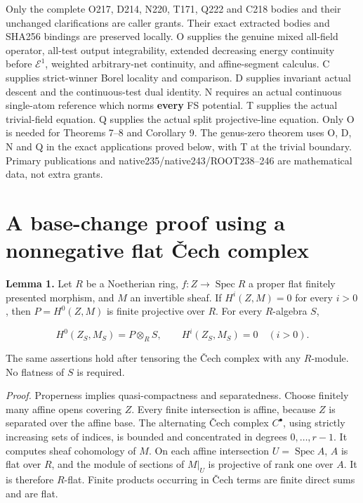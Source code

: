 \documentclass[
  11pt,
]{article}
\begin{document}
Only the complete O217, D214, N220, T171, Q222 and C218 bodies and their
unchanged clarifications are caller grants. Their exact extracted bodies
and SHA256 bindings are preserved locally. O supplies the genuine mixed
all-field operator, all-test output integrability, extended decreasing
energy continuity before \(\mathcal E^1\), weighted arbitrary-net
continuity, and affine-segment calculus. C supplies strict-winner Borel
locality and comparison. D supplies invariant actual descent and the
continuous-test dual identity. N requires an actual continuous
single-atom reference which norms \textbf{every} FS potential. T
supplies the actual trivial-field equation. Q supplies the actual split
projective-line equation. Only O is needed for Theorems 7--8 and
Corollary 9. The genus-zero theorem uses O, D, N and Q in the exact
applications proved below, with T at the trivial boundary. Primary
publications and native235/native243/ROOT238--246 are mathematical data,
not extra grants.

\section{A base-change proof using a nonnegative flat Čech
complex}\label{a-base-change-proof-using-a-nonnegative-flat-ux10dech-complex}

\textbf{Lemma 1.} Let \(R\) be a Noetherian ring,
\(f:Z\to\operatorname{Spec}R\) a proper flat finitely presented
morphism, and \(M\) an invertible sheaf. If \(H^i(Z,M)=0\) for every
\(i>0\), then \(P=H^0(Z,M)\) is finite projective over \(R\). For every
\(R\)-algebra \(S\),

\[
 H^0(Z_S,M_S)=P\otimes_RS,
 \qquad H^i(Z_S,M_S)=0\quad(i>0).
\]

The same assertions hold after tensoring the Čech complex with any
\(R\)-module. No flatness of \(S\) is required.

\emph{Proof.} Properness implies quasi-compactness and separatedness.
Choose finitely many affine opens covering \(Z\). Every finite
intersection is affine, because \(Z\) is separated over the affine base.
The alternating Čech complex \(C^\bullet\), using strictly increasing
sets of indices, is bounded and concentrated in degrees
\(0,\ldots,r-1\). It computes sheaf cohomology of \(M\). On each affine
intersection \(U=\operatorname{Spec}A\), \(A\) is flat over \(R\), and
the module of sections of \(M|_U\) is projective of rank one over \(A\).
It is therefore \(R\)-flat. Finite products occurring in Čech terms are
finite direct sums and are flat.
\end{document}
